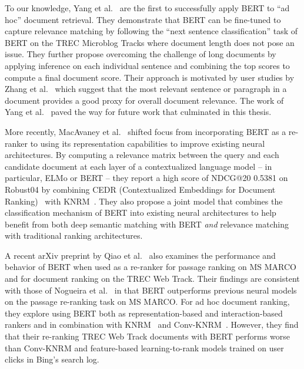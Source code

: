 To our knowledge, Yang et al.~\cite{yang2019simple} are the first to successfully apply BERT to ``ad hoc'' document retrieval.
They demonstrate that BERT can be fine-tuned to capture relevance matching by following the ``next sentence classification'' task of BERT on the TREC Microblog Tracks where document length does not pose an issue.
They further propose overcoming the challenge of long documents by applying inference on each individual sentence and combining the top scores to compute a final document score.
Their approach is motivated by user studies by Zhang et al.~\cite{zhang2018effective} which suggest that the most relevant sentence or paragraph in a document provides a good proxy for overall document relevance.
The work of Yang et al.~\cite{yang2019simple} paved the way for future work that culminated in this thesis.

More recently, MacAvaney et al.~\cite{macavaney2019cedr} shifted focus from incorporating BERT as a re-ranker to using its representation capabilities to improve existing neural architectures.
By computing a relevance matrix between the query and each candidate document at each layer of a contextualized language model -- in particular, ELMo or BERT --  they report a high score of NDCG@20 0.5381 on Robust04 by combining CEDR (Contextualized Embeddings for Document Ranking)~\cite{macavaney2019cedr} with KNRM~\cite{xiong2017knrm}.
They also propose a joint model that combines the classification mechanism of BERT into existing neural architectures to help benefit from both deep semantic matching with BERT \textit{and} relevance matching with traditional ranking architectures.

A recent arXiv preprint by Qiao et al.~\cite{Qiao:1904.07531:2019} also examines the performance and behavior of BERT when used as a re-ranker for passage ranking on MS MARCO and for document ranking on the TREC Web Track.
Their findings are consistent with those of Nogueira et al.~\cite{nogueira2019passage} in that BERT outperforms previous neural models on the passage re-ranking task on MS MARCO.
For ad hoc document ranking, they explore using BERT both as representation-based and interaction-based rankers and in combination with KNRM~\cite{xiong2017knrm} and Conv-KNRM~\cite{dai2018convolutional}.
However, they find that their re-ranking TREC Web Track documents with BERT performs worse than Conv-KNRM and feature-based learning-to-rank models trained on user clicks in Bing's search log.

